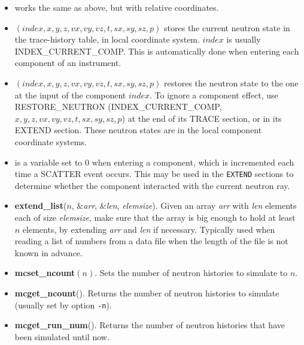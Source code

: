 \begin{itemize}
  automatic targeting).  A component of the vector is referred to as
  POS\_A\_COMP\_INDEX$(index).i$ where $i$ is $x$, $y$ or $z$.
\item {} works the same as above,
  but with relative coordinates.
\item {}$(index, x, y, z, vx, vy, vz, t, sx, sy,
sz, p)$ stores the current neutron state in the trace-history table,
in local coordinate system. $index$ is usually INDEX\_CURRENT\_COMP.
This is automatically done when entering each component of an
instrument.
\item {}$(index, x, y, z, vx, vy, vz, t, sx, sy,
sz, p)$ restores the neutron state to the one at the input of the
component $index$. To ignore a component effect, use
RESTORE\_NEUTRON (INDEX\_CURRENT\_COMP, \\
$x, y, z, vx, vy, vz, t,
sx, sy, sz, p$) at the end of its TRACE section, or in its EXTEND
section. These neutron states are in the local component coordinate
systems.
\item {} is a variable set to 0 when entering
  a component, which is incremented each time a SCATTER event occurs.
  This may be used in the \verb+EXTEND+ sections to determine whether
  the component interacted with the current neutron ray.
\item \textbf{extend\_list}($n$, \&\textit{arr}, \&\textit{len},
  \textit{elemsize}). Given an array \textit{arr} with \textit{len}
  elements each of size \textit{elemsize}, make sure that the array is
  big enough to hold at least $n$ elements, by extending \textit{arr}
  and \textit{len} if necessary. Typically used when reading a list of
  numbers from a data file when the length of the file is not known in advance.
\item \textbf{mcset\_ncount}$(n)$. Sets the number of neutron histories to simulate to $n$.
\item \textbf{mcget\_ncount}(). Returns the number of neutron histories to simulate (usually set by option \verb+-n+).
\item \textbf{mcget\_run\_num}(). Returns the number of neutron histories that have been simulated until now.
\end{itemize}

